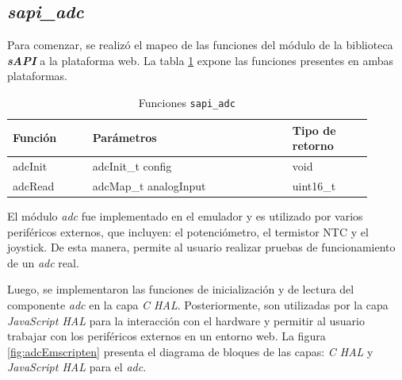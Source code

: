 \subsection{\textit{\textbf{sapi\_adc}}}

Para comenzar, se realizó el mapeo de las funciones del módulo de la biblioteca \textit{\textbf{sAPI}} a la plataforma web. La tabla \ref{tab:sapiADC} expone las funciones presentes en ambas plataformas.


\begin{table}[h]
	\centering
	\caption[Funciones \texttt{sapi\_adc}]{Funciones \texttt{sapi\_adc}}
	\begin{tabular}{p{0.20\linewidth} p{0.50\linewidth}  p{0.20\linewidth}}    
		\toprule
		\textbf{Función} 	 & \textbf{Parámetros} 		& \textbf{Tipo de retorno}  \\
		\midrule
		adcInit & adcInit\_t config		&  void \\		
		adcRead	 & adcMap\_t analogInput	&  uint16\_t \\
		\bottomrule
		\hline
	\end{tabular}
	\label{tab:sapiADC}
\end{table}

El módulo \textit{adc} fue implementado en el emulador  y es utilizado por varios periféricos externos, que incluyen: el potenciómetro, el termistor NTC y el joystick. De esta manera, permite al usuario realizar pruebas de funcionamiento de un \textit{adc} real. 

Luego, se implementaron las funciones de inicialización y de lectura del componente \textit{adc}  en la capa \textit{C HAL}. Posteriormente, son utilizadas por la capa \textit{JavaScript HAL} para la interacción con el hardware y permitir al usuario trabajar con los periféricos externos en un entorno web. La figura \ref{fig:adcEmscripten} presenta el diagrama de bloques de las capas: \textit{C HAL} y \textit{JavaScript HAL} para el \textit{adc}.

